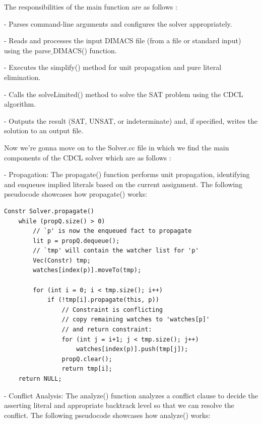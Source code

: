 \documentclass[runningheads]{llncs}
\begin{document}
The responsibilities of the main function are as follows :

- Parses command-line arguments and configures the solver appropriately.

- Reads and processes the input DIMACS file (from a file or standard input) using the parse$\_$DIMACS() function.

- Executes the simplify() method for unit propagation and pure literal elimination.

- Calls the solveLimited() method to solve the \ac{SAT} problem using the \ac{CDCL} algorithm.

- Outputs the result (SAT, UNSAT, or indeterminate) and, if specified, writes the solution to an output file.

Now we're gonna move on to the Solver.cc file in which we find the main components of the \ac{CDCL} solver which are as follows :

- Propagation: The propagate() function performs unit propagation, identifying and enqueues implied literals based on the current assignment\cite{sat-solver}. The following pseudocode\cite{sat-solver} showcases how propagate() works:

\begin{lstlisting}
Constr Solver.propagate()
    while (propQ.size() > 0)
        // `p' is now the enqueued fact to propagate
        lit p = propQ.dequeue();
        // `tmp' will contain the watcher list for 'p'
        Vec(Constr) tmp;       
        watches[index(p)].moveTo(tmp);

        for (int i = 0; i < tmp.size(); i++)
            if (!tmp[i].propagate(this, p))
                // Constraint is conflicting
                // copy remaining watches to 'watches[p]'
                // and return constraint:
                for (int j = i+1; j < tmp.size(); j++)
                    watches[index(p)].push(tmp[j]);
                propQ.clear();
                return tmp[i];
    return NULL;
\end{lstlisting}

- Conflict Analysis: The analyze() function analyzes a conflict clause to decide the asserting literal and appropriate backtrack level so that we can resolve the conflict\cite{sat-solver}. The following pseudocode\cite{sat-solver} showcases how analyze() works:
\end{document}
